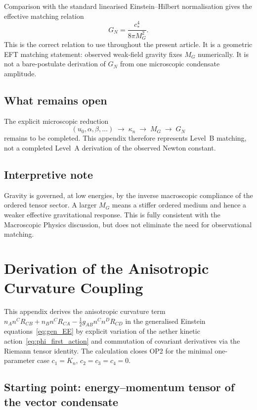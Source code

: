 \documentclass[11pt,a4paper]{article}
\numberwithin{equation}{section}
\begin{document}
Comparison with the standard linearised Einstein--Hilbert normalisation
gives the effective matching relation
\begin{equation}
  G_N = \frac{c_*^4}{8\pi M_G^2}.
  \label{eq:GN_derived}
\end{equation}
This is the correct relation to use throughout the present article.
It is a geometric EFT matching statement: observed weak-field gravity
fixes $M_G$ numerically.
It is not a bare-postulate derivation of $G_N$ from one microscopic
condensate amplitude.

\subsection{What remains open}

The explicit microscopic reduction
\[
(u_0,\alpha,\beta,\ldots)\;\longrightarrow\;\kappa_n
\;\longrightarrow\; M_G \;\longrightarrow\; G_N
\]
remains to be completed.
This appendix therefore represents Level~B matching, not a completed
Level~A derivation of the observed Newton constant.

\subsection{Interpretive note}

Gravity is governed, at low energies, by the inverse macroscopic
compliance of the ordered tensor sector.
A larger $M_G$ means a stiffer ordered medium and hence a weaker
effective gravitational response.
This is fully consistent with the Macroscopic Physics discussion,
but does not eliminate the need for observational matching.


\section{Derivation of the Anisotropic Curvature Coupling}
\label{app:curvature_coupling}

This appendix derives the anisotropic curvature term
$n_A n^C R_{CB}+n_B n^C R_{CA}-\tfrac{1}{2}g_{AB}n^C n^D R_{CD}$
in the generalised Einstein equations~\eqref{eq:gen_EE} by explicit
variation of the aether kinetic action~\eqref{eq:phi_first_action}
and commutation of covariant derivatives via the Riemann tensor
identity.  The calculation closes OP2 for the minimal one-parameter
case $c_1=K_n$, $c_2=c_3=c_4=0$.

\subsection{Starting point: energy--momentum tensor of the
vector condensate}
\end{document}
